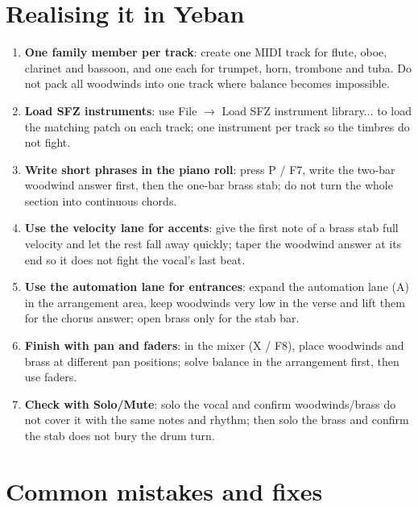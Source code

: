 \section{Realising it in Yeban}
\label{sec:winds-yeban}

\begin{enumerate}
\item \textbf{One family member per track}: create one MIDI track for flute, oboe, clarinet and bassoon, and one each for trumpet, horn, trombone and tuba. Do not pack all woodwinds into one track where balance becomes impossible.
\item \textbf{Load SFZ instruments}: use File $\rightarrow$ Load SFZ instrument library... to load the matching patch on each track; one instrument per track so the timbres do not fight.
\item \textbf{Write short phrases in the piano roll}: press P / F7, write the two-bar woodwind answer first, then the one-bar brass stab; do not turn the whole section into continuous chords.
\item \textbf{Use the velocity lane for accents}: give the first note of a brass stab full velocity and let the rest fall away quickly; taper the woodwind answer at its end so it does not fight the vocal's last beat.
\item \textbf{Use the automation lane for entrances}: expand the automation lane (A) in the arrangement area, keep woodwinds very low in the verse and lift them for the chorus answer; open brass only for the stab bar.
\item \textbf{Finish with pan and faders}: in the mixer (X / F8), place woodwinds and brass at different pan positions; solve balance in the arrangement first, then use faders.
\item \textbf{Check with Solo/Mute}: solo the vocal and confirm woodwinds/brass do not cover it with the same notes and rhythm; then solo the brass and confirm the stab does not bury the drum turn.
\end{enumerate}


\section{Common mistakes and fixes}
\label{sec:winds-mistakes}

